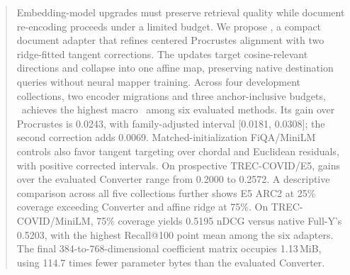 \begin{abstract}
Embedding-model upgrades must preserve retrieval quality while document re-encoding proceeds under a limited budget. We propose \method, a compact document adapter that refines centered Procrustes alignment with two ridge-fitted tangent corrections. The updates target cosine-relevant directions and collapse into one affine map, preserving native destination queries without neural mapper training. Across four development collections, two encoder migrations and three anchor-inclusive budgets, \method\ achieves the highest macro \ndcg\ among six evaluated methods. Its gain over Procrustes is 0.0243, with family-adjusted interval [0.0181, 0.0308]; the second correction adds 0.0069. Matched-initialization FiQA/MiniLM controls also favor tangent targeting over chordal and Euclidean residuals, with positive corrected intervals. On prospective TREC-COVID/E5, gains over the evaluated Converter range from 0.2000 to 0.2572. A descriptive comparison across all five collections further shows E5 ARC2 at 25\% coverage exceeding Converter and affine ridge at 75\%. On TREC-COVID/MiniLM, 75\% coverage yields 0.5195 nDCG versus native Full-Y's 0.5203, with the highest Recall@100 point mean among the six adapters. The final 384-to-768-dimensional coefficient matrix occupies 1.13\,MiB, using 114.7 times fewer parameter bytes than the evaluated Converter.
\end{abstract}
